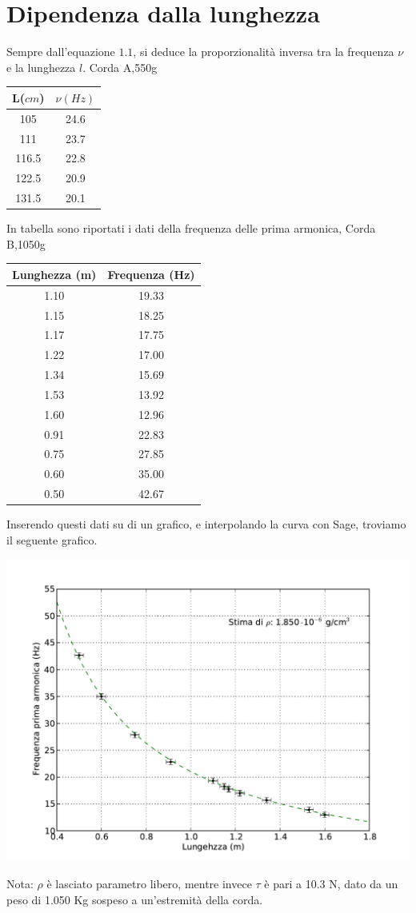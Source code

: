 \section{Dipendenza dalla lunghezza}
Sempre dall'equazione $1.1$, si deduce la proporzionalità inversa tra la frequenza $\nu$ e la lunghezza $l$. 
Corda A,550g

\begin{center}


\begin{tabular}{c|c}
L($cm$) & $\nu (Hz) $ \\
\midrule
105 & 24.6\\
111 & 23.7\\
116.5 & 22.8 \\
122.5 & 20.9 \\
131.5 & 20.1 \\
\end{tabular}
\end{center}

In tabella sono riportati i dati della frequenza delle prima armonica, 
Corda B,1050g

\begin{center}
\begin{tabular}{|c|c|}
\toprule
Lunghezza (m) & Frequenza (Hz) \\
\midrule
1.10 & 19.33 \\
1.15 & 18.25 \\
1.17 & 17.75 \\
1.22 & 17.00 \\
1.34 & 15.69 \\
1.53 & 13.92 \\
1.60 & 12.96 \\
0.91 & 22.83 \\
0.75 & 27.85 \\
0.60 & 35.00 \\
0.50 & 42.67 \\
\bottomrule
\end{tabular}
\end{center}

Inserendo questi dati su di un grafico, e interpolando la curva con Sage, troviamo il seguente grafico.

\includegraphics[scale=0.75]{"../grafici/CordaPrimaArmonica"}

Nota: $\rho$ è lasciato parametro libero, mentre invece $\tau$ è pari a 10.3 N, dato da un peso di 1.050 Kg sospeso a un'estremità della corda.
